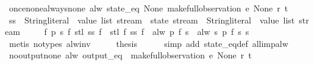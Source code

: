 \begin{isabellebody}
\endisatagproof
{\isafoldproof}%
%
\isadelimproof
\isanewline
%
\endisadelimproof
\isanewline
{}\isamarkupfalse%
\ once{\isacharunderscore}none{\isacharunderscore}always{\isacharunderscore}none{\isacharcolon}\ {\isachardoublequoteopen}alw\ {\isacharparenleft}state_eq\ None{\isacharparenright}\ {\isacharparenleft}make{\isacharunderscore}full{\isacharunderscore}observation\ e\ None\ r\ t{\isacharparenright}{\isachardoublequoteclose}\isanewline
%
\isadelimproof
%
\endisadelimproof
%
\isatagproof
{}\isamarkupfalse%
\ {\isacharminus}\isanewline
\ \ \isamarkupfalse%
\ ss\ {\isacharcolon}{\isacharcolon}\ {\isachardoublequoteopen}{\isacharparenleft}{\isacharparenleft}String{\isachardot}literal\ {\isasymtimes}\ value\ list{\isacharparenright}\ stream\ {\isasymRightarrow}\ state\ stream{\isacharparenright}\ {\isasymRightarrow}\ {\isacharparenleft}String{\isachardot}literal\ {\isasymtimes}\ value\ list{\isacharparenright}\ stream{\isachardoublequoteclose}\ \isanewline
\ \ \ \ {\isachardoublequoteopen}{\isasymforall}f\ p\ s{\isachardot}\ f\ {\isacharparenleft}stl\ {\isacharparenleft}ss\ f{\isacharparenright}{\isacharparenright}\ {\isasymnoteq}\ stl\ {\isacharparenleft}f\ {\isacharparenleft}ss\ f{\isacharparenright}{\isacharparenright}\ {\isasymor}\ alw\ p\ {\isacharparenleft}f\ s{\isacharparenright}\ {\isacharequal}\ alw\ {\isacharparenleft}{\isasymlambda}s{\isachardot}\ p\ {\isacharparenleft}f\ s{\isacharparenright}{\isacharparenright}\ s{\isachardoublequoteclose}\isanewline
\ \ \ \ \isamarkupfalse%
\ {\isacharparenleft}metis\ {\isacharparenleft}no{\isacharunderscore}types{\isacharparenright}\ alw{\isacharunderscore}inv{\isacharparenright}\isanewline
\ \ \isamarkupfalse%
\ \isamarkupfalse%
\ {\isacharquery}thesis\isanewline
\ \ \ \ \isamarkupfalse%
\ {\isacharparenleft}simp\ add{\isacharcolon}\ state_eq{\isacharunderscore}def\ all{\isacharunderscore}imp{\isacharunderscore}alw{\isacharparenright}\isanewline
{}\isamarkupfalse%
%
\endisatagproof
{\isafoldproof}%
%
\isadelimproof
\isanewline
%
\endisadelimproof
\isanewline
{}\isamarkupfalse%
\ no{\isacharunderscore}output{\isacharunderscore}none{\isacharcolon}\ {\isachardoublequoteopen}alw\ {\isacharparenleft}output_eq\ {\isacharbrackleft}{\isacharbrackright}{\isacharparenright}\ {\isacharparenleft}make{\isacharunderscore}full{\isacharunderscore}observation\ e\ None\ r\ t{\isacharparenright}{\isachardoublequoteclose}\isanewline
%
\isadelimproof
%
\endisadelimproof

\end{isabellebody}
